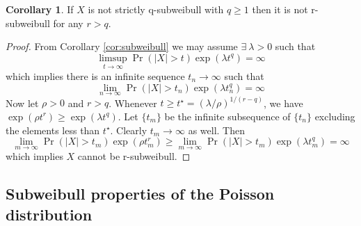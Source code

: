 \documentclass{article}
\theoremstyle{definition}
\newtheorem{corollary}{Corollary}[theorem]
\begin{document}
\begin{corollary} %
\label{cor:not-subweib}
If $X$ is not strictly q-subweibull with $q\geq 1$ then it is not r-subweibull for any $r>q$.
\end{corollary}
\begin{proof}
From Corollary \ref{cor:subweibull} we may assume $\exists~\lambda>0$ such that 
\[\limsup_{t\to\infty} \Pr(\vert X\vert>t)\exp(\lambda t^q)=\infty\]
which implies there is an infinite sequence $t_n\to\infty$ such that
\[\lim_{n\to\infty} \Pr(\vert X\vert>t_n)\exp(\lambda t_n^q)=\infty\]
Now let $\rho>0$ and $r>q$. Whenever $t\geq t^\star=(\lambda/\rho)^{1/(r-q)}$, we have $\exp(\rho t^r)\geq \exp(\lambda t^q)$. Let $\{t_m\}$ be the infinite subsequence of $\{t_n\}$ excluding the elements less than $t^\star$. Clearly $t_m\to\infty$ as well. Then 
\[\lim_{m\to\infty} \Pr(\vert X\vert > t_m)\exp(\rho t_m^r)\geq \lim_{m\to\infty} \Pr(\vert X\vert > t_m)\exp(\lambda t_m^q) = \infty \]
which implies $X$ cannot be r-subweibull.
\end{proof}

\subsection{Subweibull properties of the Poisson distribution}
\end{document}
